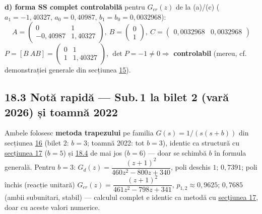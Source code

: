 \documentclass[10pt,a4paper]{article}
\begin{document}
\textbf{d) forma SS complet controlabilă} pentru $G_{er}(z)$ de la (a)/(c) ($a_1{=}{-}1{,}40327,\,a_0{=}0{,}40987,\,b_1{=}b_0{=}0{,}0032968$):
$$A=\begin{pmatrix}0&1\\-0{,}40987&1{,}40327\end{pmatrix},\ B=\begin{pmatrix}0\\1\end{pmatrix},\ C=\begin{pmatrix}0{,}0032968&0{,}0032968\end{pmatrix}$$
$P{=}[B\ AB]{=}\begin{pmatrix}0&1\\1&1{,}40327\end{pmatrix}$, $\det P{=}{-}1\ne0\Rightarrow$ \textbf{controlabil} (mereu, cf. demonstrației generale din secțiunea \hyperref[sec:15]{15}).

\subsection*{18.3 Notă rapidă — Sub.\,1 la bilet 2 (vară 2026) și toamnă 2022}
Ambele folosesc \textbf{metoda trapezului} pe familia $G(s)=1/(s(s+b))$ din secțiunea \hyperref[sec:16]{16} (bilet 2: $b{=}3$; toamnă 2022: tot $b{=}3$), identic ca structură cu \hyperref[sec:17]{secțiunea 17} ($b{=}5$) și \hyperref[sec:18]{18.4} de mai jos ($b{=}6$) — doar se schimbă $b$ în formula generală. Pentru $b{=}3$: $G_d(z)=\dfrac{(z+1)^2}{460z^2-800z+340}$, poli deschis $1;\,0{,}7391$; poli închis (reacție unitară) $G_{er}(z)=\dfrac{(z+1)^2}{461z^2-798z+341}$, $p_{1,2}\approx0{,}9625;\,0{,}7685$ (ambii subunitari, stabil) — calculul complet e identic ca metodă cu \hyperref[sec:17]{secțiunea 17}, doar cu aceste valori numerice.
\end{document}

